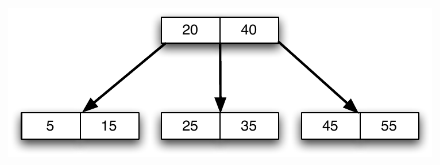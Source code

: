 \documentclass[11pt]{exam}
\begin{document}
\begin{questions}
\begin{figure}[htbp]
	\begin{center}
	   \includegraphics[width=4.5in]{final_23tree_insert}
	\end{center}   
\end{figure}

\end{questions}
\end{document}
